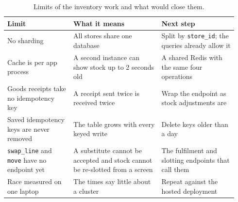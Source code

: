 \begin{table}[ht]
  \centering
  \footnotesize
  \begin{tabular}{@{}>{\raggedright\arraybackslash}p{0.27\linewidth}>{\raggedright\arraybackslash}p{0.36\linewidth}
                  >{\raggedright\arraybackslash}p{0.31\linewidth}@{}}
    \toprule
    Limit & What it means & Next step \\
    \midrule
    No sharding & All stores share one database & Split by \texttt{store\_id}; the queries already allow it \\
    \addlinespace[3pt]
    Cache is per app process & A second instance can show stock up to 2 seconds old & A shared Redis with the same
      four operations \\
    \addlinespace[3pt]
    Goods receipts take no idempotency key & A receipt sent twice is received twice & Wrap the endpoint as stock
      adjustments are \\
    \addlinespace[3pt]
    Saved idempotency keys are never removed & The table grows with every keyed write & Delete keys older than a
      day \\
    \addlinespace[3pt]
    \texttt{swap\_line} and \texttt{move} have no endpoint yet & A substitute cannot be accepted and stock cannot
      be re-slotted from a screen & The fulfilment and slotting endpoints that call them \\
    \addlinespace[3pt]
    Race measured on one laptop & The times say little about a cluster & Repeat against the hosted deployment \\
    \bottomrule
  \end{tabular}
  \caption{Limits of the inventory work and what would close them.}
  \label{tab:m1-limits}
\end{table}
